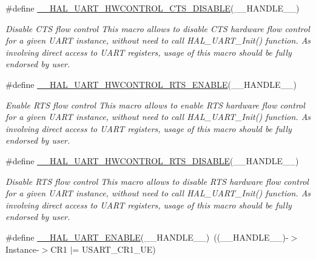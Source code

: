 \begin{DoxyCompactItemize}
\#define \hyperlink{group___u_a_r_t___exported___macros_ga0a26cb3a576c2700f76a7c697c86a499}{\+\_\+\+\_\+\+H\+A\+L\+\_\+\+U\+A\+R\+T\+\_\+\+H\+W\+C\+O\+N\+T\+R\+O\+L\+\_\+\+C\+T\+S\+\_\+\+D\+I\+S\+A\+B\+LE}(\+\_\+\+\_\+\+H\+A\+N\+D\+L\+E\+\_\+\+\_\+)
\begin{DoxyCompactList}\small\item\em Disable C\+TS flow control This macro allows to disable C\+TS hardware flow control for a given U\+A\+RT instance, without need to call H\+A\+L\+\_\+\+U\+A\+R\+T\+\_\+\+Init() function. As involving direct access to U\+A\+RT registers, usage of this macro should be fully endorsed by user. \end{DoxyCompactList}\item 
\#define \hyperlink{group___u_a_r_t___exported___macros_ga017ec9001ff33136f87cc4034b2709a6}{\+\_\+\+\_\+\+H\+A\+L\+\_\+\+U\+A\+R\+T\+\_\+\+H\+W\+C\+O\+N\+T\+R\+O\+L\+\_\+\+R\+T\+S\+\_\+\+E\+N\+A\+B\+LE}(\+\_\+\+\_\+\+H\+A\+N\+D\+L\+E\+\_\+\+\_\+)
\begin{DoxyCompactList}\small\item\em Enable R\+TS flow control This macro allows to enable R\+TS hardware flow control for a given U\+A\+RT instance, without need to call H\+A\+L\+\_\+\+U\+A\+R\+T\+\_\+\+Init() function. As involving direct access to U\+A\+RT registers, usage of this macro should be fully endorsed by user. \end{DoxyCompactList}\item 
\#define \hyperlink{group___u_a_r_t___exported___macros_ga8c034e96ad8f263cafeb5898ff7311fd}{\+\_\+\+\_\+\+H\+A\+L\+\_\+\+U\+A\+R\+T\+\_\+\+H\+W\+C\+O\+N\+T\+R\+O\+L\+\_\+\+R\+T\+S\+\_\+\+D\+I\+S\+A\+B\+LE}(\+\_\+\+\_\+\+H\+A\+N\+D\+L\+E\+\_\+\+\_\+)
\begin{DoxyCompactList}\small\item\em Disable R\+TS flow control This macro allows to disable R\+TS hardware flow control for a given U\+A\+RT instance, without need to call H\+A\+L\+\_\+\+U\+A\+R\+T\+\_\+\+Init() function. As involving direct access to U\+A\+RT registers, usage of this macro should be fully endorsed by user. \end{DoxyCompactList}\item 
\#define \hyperlink{group___u_a_r_t___exported___macros_ga49eb5ea4996a957afeb8be2793ba3fe9}{\+\_\+\+\_\+\+H\+A\+L\+\_\+\+U\+A\+R\+T\+\_\+\+E\+N\+A\+B\+LE}(\+\_\+\+\_\+\+H\+A\+N\+D\+L\+E\+\_\+\+\_\+)~((\+\_\+\+\_\+\+H\+A\+N\+D\+L\+E\+\_\+\+\_\+)-\/$>$Instance-\/$>$C\+R1 $\vert$=  U\+S\+A\+R\+T\+\_\+\+C\+R1\+\_\+\+UE)

\end{DoxyCompactItemize}
